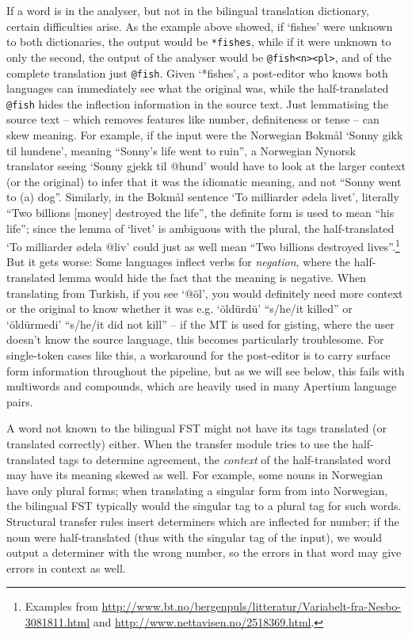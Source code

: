 \documentclass[10pt, a4paper]{article}
\newcommand{\ana}[1]{\texttt{#1}}
\newcommand{\f}[1]{`#1'}
\begin{document}
If a word is in the analyser, but not in the bilingual translation
dictionary, certain difficulties arise. As the example above showed,
if \f{fishes} were unknown to both dictionaries, the output would be
\ana{*fishes}, while if it were unknown to only the second, the output
of the analyser would be \ana{@fish<n><pl>}, and of the complete
translation just \ana{@fish}. Given \f{*fishes}, a post-editor who
knows both languages can immediately see what the original was, while
the half-translated \ana{@fish} hides the inflection information in
the source text. Just lemmatising the source text – which removes
features like number, definiteness or tense – can skew meaning. For
example, if the input were the Norwegian Bokmål \f{Sonny gikk til
  hundene}, meaning ``Sonny's life went to ruin'', a Norwegian Nynorsk
translator seeing \f{Sonny gjekk til @hund} would have to look at the
larger context (or the original) to infer that it was the idiomatic
meaning, and not ``Sonny went to (a) dog''. Similarly, in the Bokmål
sentence \f{To milliarder ødela livet}, literally ``Two billions
[money] destroyed the life'', the definite form is used to mean ``his
life''; since the lemma of \f{livet} is ambiguous with the plural, the
half-translated \f{To milliarder ødela @liv} could just as well mean
``Two billions destroyed lives''.\footnote{Examples from
  \href{http://www.bt.no/bergenpuls/litteratur/Variabelt-fra-Nesbo-3081811.html}{http://www.bt.no/bergenpuls/litteratur/Variabelt-fra-Nesbo-3081811.html}
  and
  \href{http://www.nettavisen.no/2518369.html}{http://www.nettavisen.no/2518369.html}.}
But it gets worse: Some languages inflect verbs for \emph{negation},
where the half-translated lemma would hide the fact that the meaning
is negative. When translating from Turkish, if you see \f{@öl}, you
would definitely need more context or the original to know whether it
was e.g. \f{öldürdü} ``s/he/it killed'' or \f{öldürmedi} ``s/he/it did
not kill'' – if the MT is used for gisting, where the user doesn't
know the source language, this becomes particularly troublesome. For
single-token cases like this, a workaround for the post-editor is to
carry surface form information throughout the pipeline, but as we will
see below, this fails with multiwords and compounds, which are heavily
used in many Apertium language pairs.

A word not known to the bilingual FST might not have its tags
translated (or translated correctly) either. When the transfer module
tries to use the half-translated tags to determine agreement, the
\emph{context} of the half-translated word may have its meaning skewed
as well. For example, some nouns in Norwegian have only plural forms;
when translating a singular form from into Norwegian, the bilingual
FST typically would the singular tag to a plural tag for such words.
Structural transfer rules insert determiners which are inflected for
number; if the noun were half-translated (thus with the singular tag
of the input), we would output a determiner with the wrong number, so
the errors in that word may give errors in context as well.
\end{document}
